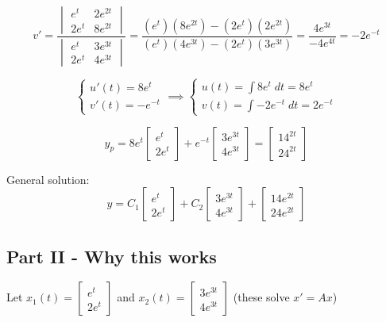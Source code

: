 \documentclass[12pt]{article}
\begin{document}
\[v' = \frac{\begin{vmatrix}
    e^t & 2e^{2t}\\
    2e^t & 8e^{2t}
\end{vmatrix}}{\begin{vmatrix}
    e^t & 3e^{3t}\\
    2e^t & 4e^{3t}
\end{vmatrix}} = \frac{(e^{t})(8e^{2t}) - (2e^{t})(2e^{2t})}{(e^t)(4e^{3t}) - (2e^t)(3e^{3t})} = \frac{4e^{3t}}{-4e^{4t}} = -2e^{-t}\]

\[\begin{cases}
    u'(t) = 8e^t\\
    v'(t) = -e^{-t}
\end{cases} \implies \begin{cases}
    u(t) = \int 8e^t \; dt = 8e^t\\
    v(t) = \int -2e^{-t} \; dt = 2e^{-t}
\end{cases}\]

\[y_p = 8e^t \begin{bmatrix}
    e^t\\
    2e^t
\end{bmatrix} + e^{-t} \begin{bmatrix}
    3e^{3t}\\
    4e^{3t}
\end{bmatrix} = \begin{bmatrix}
    14^{2t}\\
    24^{2t}
\end{bmatrix}\]

General solution:
\[\boxed{y = C_1 \begin{bmatrix}
    e^t\\
    2e^t
\end{bmatrix} + C_2 \begin{bmatrix}
    3e^{3t}\\
    4e^{3t}
\end{bmatrix} + \begin{bmatrix}
    14e^{2t}\\
    24e^{2t}
\end{bmatrix}}\]

\subsection*{Part II - Why this works}
Let $x_1(t) = \begin{bmatrix}
    e^t\\
    2e^t
\end{bmatrix}$ and $x_2(t) = \begin{bmatrix}
    3e^{3t}\\
    4e^{3t}
\end{bmatrix}$ (these solve $x' = Ax$)
\end{document}
